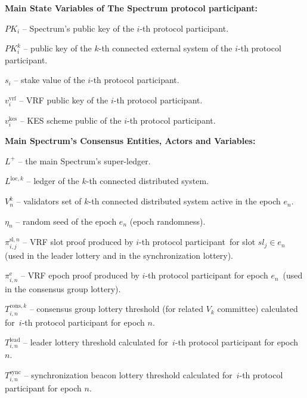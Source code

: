\noindent
\textbf{Main State Variables of The Spectrum protocol participant:}
\begin{legal}
    \item[\ding{113}] $PK_i$ -- Spectrum's public key of the $i$-th protocol participant.
    \item[\ding{113}] $PK^k_i$ -- public key of the $k$-th connected external system of the $i$-th protocol participant.
    \item[\ding{113}] $s_i$ -- stake value of the $i$-th protocol participant.
    \item[\ding{113}] $v^{\text{vrf}}_i$ -- VRF public key of the $i$-th protocol participant.
    \item[\ding{113}] $v^{\text{kes}}_i$ -- KES scheme public of the $i$-th protocol participant.
\end{legal}
\bigbreak

\noindent
\textbf{Main Spectrum's Consensus Entities, Actors and Variables:}
\begin{legal}
    \item[\ding{113}] $L^+$ -- the main Spectrum's super-ledger.
    \item[\ding{113}] $L^{\text{loc}, k}$ -- ledger of the $k$-th connected distributed system.
    \item[\ding{113}] $V^k_n$ -- validators set of $k$-th connected distributed system active in the epoch $e_n$.
    \item[\ding{113}] $\eta_n$ -- random seed of the epoch $e_n$ (epoch randomness).
    \item[\ding{113}] $\pi^{\text{sl}, n}_{i, j}$ -- VRF slot proof produced by $i$-th protocol participant\
    for slot $sl_j \in e_n$ (used in the leader lottery and in the synchronization lottery).
    \item[\ding{113}] $\pi^{\text{e}}_{i, n}$ -- VRF epoch proof produced by $i$-th protocol participant for epoch $e_n$\
    (used in the consensus group lottery).
    \item[\ding{113}] $T^{\text{cons}, k}_{i, n}$ -- consensus group lottery threshold (for related $V_k$ committee) calculated for\
    $i$-th protocol participant for epoch $n$.
    \item[\ding{113}] $T^{\text{lead}}_{i, n}$ -- leader lottery threshold calculated for\
    $i$-th protocol participant for epoch $n$.
    \item[\ding{113}] $T^{\text{sync}}_{i, n}$ -- synchronization beacon lottery threshold calculated for\
    $i$-th protocol participant for epoch $n$.
\end{legal}

